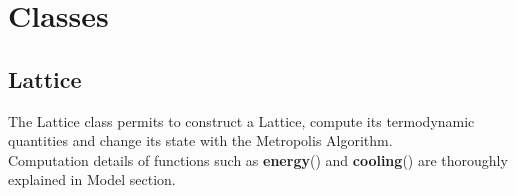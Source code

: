 
\begin{flushright}

\end{flushright}\section*{Classes}
	
\subsection*{Lattice}

The Lattice class permits to construct a Lattice, compute its termodynamic quantities 
and change its state with the Metropolis Algorithm. \\	  
Computation details of functions such as \textbf{energy}() and \textbf{cooling}() are thoroughly explained in Model section. \\ 

